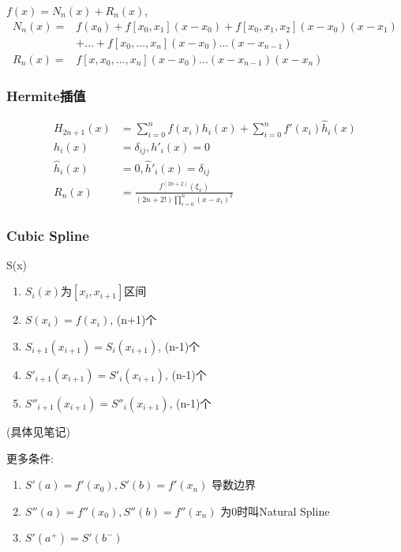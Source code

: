 \documentclass{source/Paper}
\begin{document}
    $f(x)=N_n(x)+R_n(x)$, 
    \begin{align*}
        N_n(x)=& f\left(x_{0}\right)+f\left[x_{0}, x_{1}\right]\left(x-x_{0}\right)+f\left[x_{0}, x_{1}, x_{2}\right]\left(x-x_{0}\right)\left(x-x_{1}\right)\\
        &+\ldots +f\left[x_{0}, \ldots,x_{n}\right]\left(x-x_{0}\right) \ldots\left(x-x_{n-1}\right) \\
        R_n(x)=& f\left[x, x_{0}, \ldots, x_{n}\right]\left(x-x_{0}\right) \ldots\left(x-x_{n-1}\right)\left(x-x_{n}\right)
    \end{align*}

    \subsubsection{Hermite插值}
    \begin{align*}
        H_{2n+1}(x)&=\sum_{i=0}^n f(x_i)h_i(x)+\sum_{i=0}^nf'(x_i)\hat{h}_i(x)\\
        h_i(x)&=\delta_{ij}, h'_i(x)=0\\
        \hat{h}_i(x)&=0, \hat{h}'_i(x)=\delta_{ij}\\
        R_n(x)&=\frac{f^{(2n+2)}(\xi_x)}{(2n+2!)\prod_{i=0}^n(x-x_i)^2}
    \end{align*}

    \subsubsection{Cubic Spline}
    S(x)
    \begin{enumerate}
        \item $S_i(x)$为$[x_i,x_{i+1}]$区间
        \item $S(x_i)=f(x_i)$, (n+1)个
        \item $S_{i+1}(x_{i+1})=S_i(x_{i+1})$, (n-1)个
        \item $S'_{i+1}(x_{i+1})=S'_i(x_{i+1})$, (n-1)个
        \item $S''_{i+1}(x_{i+1})=S''_i(x_{i+1})$, (n-1)个
    \end{enumerate}
    (具体见笔记)

    更多条件:
    \begin{enumerate}
        \item $S'(a)=f'(x_0), S'(b)=f'(x_n)$ 导数边界
        \item $S''(a)=f''(x_0), S''(b)=f''(x_n)$ 为0时叫Natural Spline
        \item $S'(a^+)=S'(b^-)$
    \end{enumerate}
\end{document}
